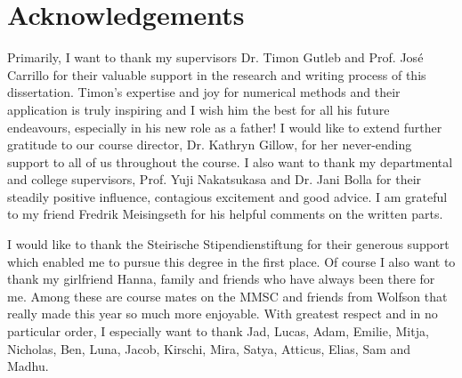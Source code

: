 \chapter*{Acknowledgements}

Primarily, I want to thank my supervisors Dr. Timon Gutleb and Prof. José Carrillo for their valuable support in the research and writing process of this dissertation.
Timon's expertise and joy for numerical methods and their application is truly inspiring and I wish him the best for all his future endeavours, especially in his new role as a father!
I would like to extend further gratitude to our course director, Dr. Kathryn Gillow, for her never-ending support to all of us throughout the course.
I also want to thank my departmental and college supervisors, Prof. Yuji Nakatsukasa and Dr. Jani Bolla for their steadily positive influence, contagious excitement and good advice.
I am grateful to my friend Fredrik Meisingseth for his helpful comments on the written parts.

I would like to thank the Steirische Stipendienstiftung for their generous support which enabled me to pursue this degree in the first place.
Of course I also want to thank my girlfriend Hanna, family and friends who have always been there for me.
Among these are course mates on the MMSC and friends from Wolfson that really made this year so much more enjoyable.
With greatest respect and in no particular order, I especially want to thank Jad, Lucas, Adam, Emilie, Mitja, Nicholas, Ben, Luna, Jacob, Kirschi, Mira, Satya, Atticus, Elias, Sam and Madhu.


